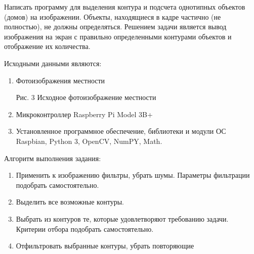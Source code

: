 
Написать программу для выделения контура и подсчета однотипных объектов (домов) на изображении. Объекты, находящиеся в кадре частично (не полностью), не должны определяться. Решением задачи является вывод изображения на экран с правильно определенными контурами объектов и отображение их количества. 

\solutionSection

Исходными данными являются:

\begin{enumerate}
    \item Фотоизображения местности
          \begin{center}
            Рис. 3 Исходное фотоизображение местности
          \end{center} 
    \item Микроконтроллер Raspberry Pi Model 3B+ 
    \item Установленное программное обеспечение, библиотеки и модули ОС Raspbian, Python 3, OpenCV, NumPY, Math.
\end{enumerate}

Алгоритм выполнения задания:

\begin{enumerate}
    \item Применить к изображению фильтры, убрать шумы. Параметры фильтрации подобрать самостоятельно.
    \item Выделить все возможные контуры.
    \item Выбрать из контуров те, которые удовлетворяют требованию задачи. Критерии отбора подобрать самостоятельно.
    \item Отфильтровать выбранные контуры, убрать повторяющие
\end{enumerate}